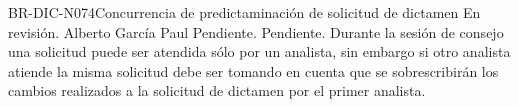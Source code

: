 \begin{BusinessRule}{BR-DIC-N074}{Concurrencia de predictaminación de solicitud de dictamen}
	{\bcCondition}    %
	{\btEnabler}     %
	{\blControlling}    %
	\BRItem[Estado] En revisión.
	 Alberto García Paul 
	 Pendiente.
	 Pendiente.
	\BRItem[Descripción] Durante la sesión de consejo una solicitud puede ser atendida sólo por un analista, sin embargo si otro analista atiende la misma solicitud debe ser tomando en cuenta que se sobrescribirán los cambios realizados a la solicitud de dictamen por el primer analista.
	\BRItem[Sentencia]	\cdtEmpty
	
	
	\BRItem[Motivación] 
	
	
\end{BusinessRule}


